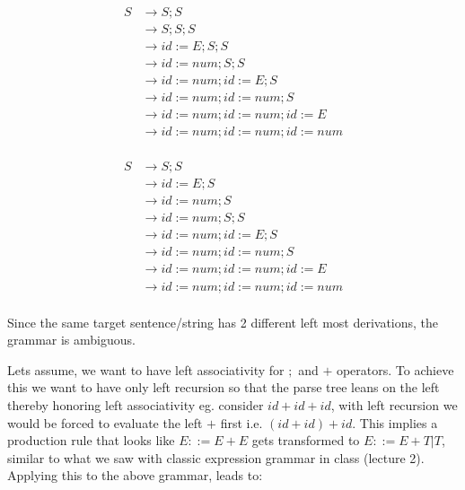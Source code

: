 \documentclass{article}
\begin{document}
    \begin{align*}
        S   & \rightarrow S ; S \\
            & \rightarrow S ; S ; S \\
            & \rightarrow id := E ; S ; S \\
            & \rightarrow id := num ; S ; S \\
            & \rightarrow id := num ; id := E ; S \\
            & \rightarrow id := num ; id := num ; S \\
            & \rightarrow id := num ; id := num ; id := E \\
            & \rightarrow id := num ; id := num ; id := num \\
    \end{align*}

    \begin{align*}
        S   & \rightarrow S ; S \\
            & \rightarrow id := E ; S \\
            & \rightarrow id := num ; S \\
            & \rightarrow id := num ; S ; S \\
            & \rightarrow id := num ; id := E ; S \\
            & \rightarrow id := num ; id := num ; S \\
            & \rightarrow id := num ; id := num ; id := E \\
            & \rightarrow id := num ; id := num ; id := num \\
    \end{align*}

    Since the same target sentence/string has 2 different left most derivations, the grammar is ambiguous.

    Lets assume, we want to have left associativity for $;$ and $+$ operators. To achieve this we want to have only left recursion so that the parse tree leans on the left thereby honoring left associativity eg. consider $id + id + id$, with left recursion we would be forced to evaluate the left $+$ first i.e. $(id + id) + id$. This implies a production rule that looks like $E ::= E + E$ gets transformed to $E ::= E + T | T$, similar to what we saw with classic expression grammar in class (lecture 2). Applying this to the above grammar, leads to:
\end{document}
